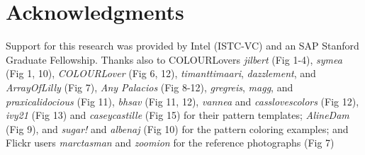 \section*{Acknowledgments}

Support for this research was provided by Intel (ISTC-VC) and an SAP Stanford Graduate Fellowship.
Thanks also to COLOURLovers \textit{jilbert} (Fig 1-4), \textit{symea} (Fig 1, 10), \textit{COLOURLover} (Fig 6, 12), \textit{timanttimaari}, \textit{dazzlement}, and \textit{ArrayOfLilly} (Fig 7), \textit{Any Palacios} (Fig 8-12), \textit{gregreis}, \textit{magg}, and \textit{praxicalidocious} (Fig 11), \textit{bhsav} (Fig 11, 12), \textit{vannea} and \textit{casslovescolors} (Fig 12), \textit{ivy21} (Fig 13) and \textit{caseycastille} (Fig 15) for their pattern templates; \textit{AlineDam} (Fig 9), and \textit{sugar!} and \textit{albenaj} (Fig 10) for the pattern coloring examples; and Flickr users \textit{marctasman} and \textit{zoomion} for the reference photographs (Fig 7)       
